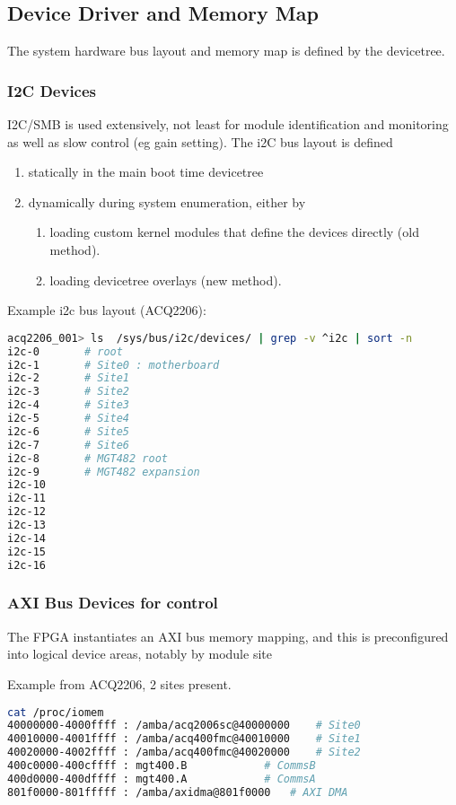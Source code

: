 \documentclass[]{article}
\begin{document}
\subsection{Device Driver and Memory Map}
The system hardware bus layout and memory map is defined by the devicetree.

\subsubsection{I2C Devices}
I2C/SMB is used extensively, not least for module identification and monitoring as well as slow control (eg gain setting).
The i2C bus layout is defined 
\begin{enumerate}
    \item statically in the main boot time devicetree  
    \item dynamically during system enumeration, either by
    \begin{enumerate}
	\item loading custom kernel modules that define the devices directly (old method).
	\item loading devicetree overlays (new method).
    \end{enumerate}	
\end{enumerate}

Example i2c bus layout (ACQ2206):

\begin{lstlisting}[language=bash,style=bashstyle,frame=single]
acq2206_001> ls  /sys/bus/i2c/devices/ | grep -v ^i2c | sort -n
i2c-0		# root
i2c-1		# Site0 : motherboard
i2c-2		# Site1
i2c-3		# Site2
i2c-4		# Site3
i2c-5		# Site4
i2c-6		# Site5
i2c-7		# Site6
i2c-8		# MGT482 root
i2c-9		# MGT482 expansion
i2c-10
i2c-11
i2c-12
i2c-13
i2c-14
i2c-15
i2c-16

\end{lstlisting}

\subsubsection{AXI Bus Devices for control}
The FPGA instantiates an AXI bus memory mapping, and this is preconfigured into logical device areas, notably by module site

Example from ACQ2206, 2 sites present.
\begin{lstlisting}[language=bash,style=bashstyle,frame=single]
cat /proc/iomem
40000000-4000ffff : /amba/acq2006sc@40000000	# Site0
40010000-4001ffff : /amba/acq400fmc@40010000	# Site1
40020000-4002ffff : /amba/acq400fmc@40020000	# Site2
400c0000-400cffff : mgt400.B			# CommsB
400d0000-400dffff : mgt400.A			# CommsA
801f0000-801fffff : /amba/axidma@801f0000	# AXI DMA
\end{lstlisting}
\end{document}
